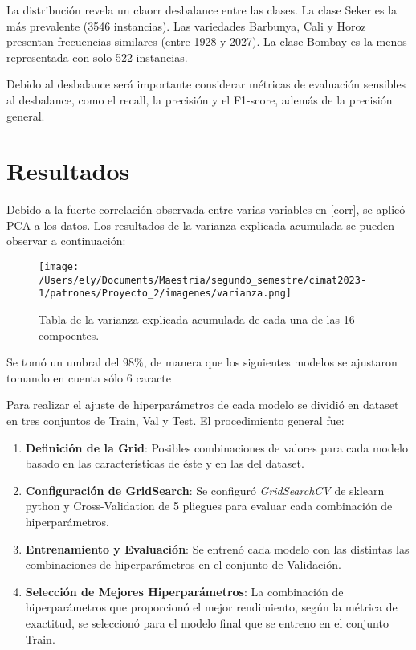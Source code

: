 \documentclass[letterpaper,spanish,reprint,nofootinbib,showkeys,aps]{revtex4-2}
\begin{document}
La distribución revela un claorr desbalance entre las clases. La clase Seker es la más prevalente (3546 instancias). Las variedades Barbunya, Cali y Horoz presentan frecuencias similares (entre 1928 y 2027). La clase Bombay es la menos representada con solo 522 instancias. 


Debido al desbalance será importante considerar métricas de evaluación sensibles al desbalance, como el recall, la precisión y el F1-score, además de la precisión general. 












\section{Resultados}


Debido a la fuerte correlación observada entre varias variables en \ref{corr}, se aplicó PCA a los datos. Los resultados de la varianza explicada acumulada se pueden observar a continuación:
\begin{figure} [H]
	\begin{center}
		\texttt{[image: /Users/ely/Documents/Maestria/segundo\_semestre/cimat2023-1/patrones/Proyecto\_2/imagenes/varianza.png]}
		\caption{Tabla de la varianza explicada acumulada de cada una de las 16 compoentes. }
		\label{var} 
   \end{center} 
\end{figure}

Se tomó un umbral del 98$\%$, de manera que los siguientes modelos se ajustaron tomando en cuenta sólo 6 caracte

Para realizar el ajuste de hiperparámetros de cada modelo se dividió en dataset en tres conjuntos de Train, Val y Test. El procedimiento general fue:
\begin{enumerate}
    \item \textbf{Definición de la Grid}: Posibles combinaciones de valores para cada modelo basado en las características de éste y en las del dataset.
    \item \textbf{Configuración de GridSearch}: Se configuró \textit{GridSearchCV} de sklearn python y Cross-Validation de 5 pliegues para evaluar cada combinación de hiperparámetros.
    \item \textbf{Entrenamiento y Evaluación}: Se entrenó cada modelo con las distintas las combinaciones de hiperparámetros en el conjunto de Validación.
    \item \textbf{Selección de Mejores Hiperparámetros}: La combinación de hiperparámetros que proporcionó el mejor rendimiento, según la métrica de exactitud, se seleccionó para el modelo final que se entreno en el conjunto Train.
\end{enumerate}
\end{document}
